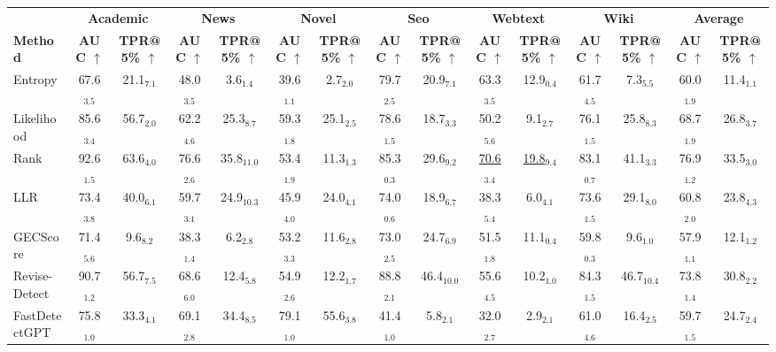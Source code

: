 \begin{tabular}{lcccccccccccccc}
\toprule
 & \multicolumn{2}{c}{\textbf{Academic}} & \multicolumn{2}{c}{\textbf{News}} & \multicolumn{2}{c}{\textbf{Novel}} & \multicolumn{2}{c}{\textbf{Seo}} & \multicolumn{2}{c}{\textbf{Webtext}} & \multicolumn{2}{c}{\textbf{Wiki}} & \multicolumn{2}{c}{\textbf{Average}}\\
\cmidrule(lr){2-3} \cmidrule(lr){4-5} \cmidrule(lr){6-7} \cmidrule(lr){8-9} \cmidrule(lr){10-11} \cmidrule(lr){12-13}
\textbf{Method} & \textbf{AUC $\uparrow$} & \textbf{TPR@5\% $\uparrow$} & \textbf{AUC $\uparrow$} & \textbf{TPR@5\% $\uparrow$} & \textbf{AUC $\uparrow$} & \textbf{TPR@5\% $\uparrow$} & \textbf{AUC $\uparrow$} & \textbf{TPR@5\% $\uparrow$} & \textbf{AUC $\uparrow$} & \textbf{TPR@5\% $\uparrow$} & \textbf{AUC $\uparrow$} & \textbf{TPR@5\% $\uparrow$} & \textbf{AUC $\uparrow$} & \textbf{TPR@5\% $\uparrow$} \\
\midrule
Entropy & 67.6$_{3.5}$ & 21.1$_{7.1}$ & 48.0$_{3.5}$ & 3.6$_{1.4}$ & 39.6$_{1.1}$ & 2.7$_{2.0}$ & 79.7$_{2.5}$ & 20.9$_{7.1}$ & 63.3$_{3.5}$ & 12.9$_{0.4}$ & 61.7$_{4.5}$ & 7.3$_{5.5}$ & 60.0$_{1.9}$ & 11.4$_{1.1}$ \\
Likelihood & 85.6$_{3.4}$ & 56.7$_{2.0}$ & 62.2$_{4.6}$ & 25.3$_{8.7}$ & 59.3$_{1.8}$ & 25.1$_{2.5}$ & 78.6$_{1.5}$ & 18.7$_{3.3}$ & 50.2$_{5.6}$ & 9.1$_{2.7}$ & 76.1$_{1.5}$ & 25.8$_{8.3}$ & 68.7$_{1.9}$ & 26.8$_{3.7}$ \\
Rank & 92.6$_{1.5}$ & 63.6$_{4.0}$ & 76.6$_{2.6}$ & 35.8$_{11.0}$ & 53.4$_{1.9}$ & 11.3$_{1.3}$ & 85.3$_{0.3}$ & 29.6$_{9.2}$ & \cellcolor{orange!25}\underline{70.6$_{3.4}$} & \cellcolor{orange!25}\underline{19.8$_{9.4}$} & 83.1$_{0.7}$ & 41.1$_{3.3}$ & 76.9$_{1.2}$ & 33.5$_{3.0}$ \\
LLR & 73.4$_{3.8}$ & 40.0$_{6.1}$ & 59.7$_{3.1}$ & 24.9$_{10.3}$ & 45.9$_{4.0}$ & 24.0$_{4.1}$ & 74.0$_{0.6}$ & 18.9$_{6.7}$ & 38.3$_{5.4}$ & 6.0$_{4.1}$ & 73.6$_{1.5}$ & 29.1$_{8.0}$ & 60.8$_{2.0}$ & 23.8$_{4.3}$ \\
GECScore & 71.4$_{5.6}$ & 9.6$_{8.2}$ & 38.3$_{1.4}$ & 6.2$_{2.8}$ & 53.2$_{3.3}$ & 11.6$_{2.8}$ & 73.0$_{2.5}$ & 24.7$_{6.9}$ & 51.5$_{1.8}$ & 11.1$_{0.4}$ & 59.8$_{0.3}$ & 9.6$_{1.0}$ & 57.9$_{1.1}$ & 12.1$_{1.2}$ \\
Revise-Detect & 90.7$_{1.2}$ & 56.7$_{7.5}$ & 68.6$_{6.0}$ & 12.4$_{5.8}$ & 54.9$_{2.6}$ & 12.2$_{1.7}$ & 88.8$_{2.1}$ & 46.4$_{10.0}$ & 55.6$_{4.5}$ & 10.2$_{1.0}$ & 84.3$_{1.5}$ & 46.7$_{10.4}$ & 73.8$_{1.4}$ & 30.8$_{2.2}$ \\
FastDetectGPT & 75.8$_{1.0}$ & 33.3$_{4.1}$ & 69.1$_{2.8}$ & 34.4$_{8.5}$ & 79.1$_{1.0}$ & 55.6$_{3.8}$ & 41.4$_{1.0}$ & 5.8$_{2.1}$ & 32.0$_{2.7}$ & 2.9$_{2.1}$ & 61.0$_{4.6}$ & 16.4$_{2.5}$ & 59.7$_{1.5}$ & 24.7$_{2.4}$ \\

\end{tabular}
